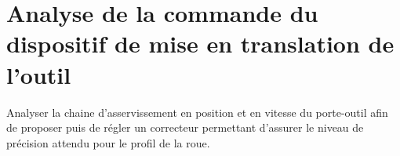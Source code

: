 \section{Analyse de la commande du dispositif de mise en translation de l'outil}
\begin{obj}
Analyser la chaine d'asservissement en position et en vitesse du porte-outil afin de proposer puis de régler un correcteur permettant d'assurer le niveau de précision attendu pour le profil de la roue.
\end{obj}

%
%
%  
%

